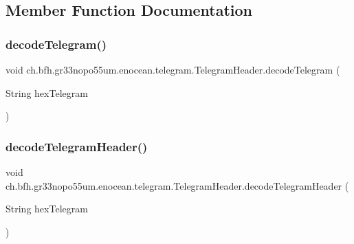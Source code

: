 \subsection{Member Function Documentation}
\hypertarget{classch_1_1bfh_1_1gr33nopo55um_1_1enocean_1_1telegram_1_1_telegram_header_a9f1071f31c3eb9f555480aea587b4ccb}{}\label{classch_1_1bfh_1_1gr33nopo55um_1_1enocean_1_1telegram_1_1_telegram_header_a9f1071f31c3eb9f555480aea587b4ccb} 
\subsubsection{\texorpdfstring{decode\+Telegram()}{decodeTelegram()}}
{\footnotesize\ttfamily void ch.\+bfh.\+gr33nopo55um.\+enocean.\+telegram.\+Telegram\+Header.\+decode\+Telegram (\begin{DoxyParamCaption}\item[{String}]{hex\+Telegram }\end{DoxyParamCaption})}

\hypertarget{classch_1_1bfh_1_1gr33nopo55um_1_1enocean_1_1telegram_1_1_telegram_header_a436b8f22f13d0f91aa9c8e3f164d15d5}{}\label{classch_1_1bfh_1_1gr33nopo55um_1_1enocean_1_1telegram_1_1_telegram_header_a436b8f22f13d0f91aa9c8e3f164d15d5} 
\subsubsection{\texorpdfstring{decode\+Telegram\+Header()}{decodeTelegramHeader()}}
{\footnotesize\ttfamily void ch.\+bfh.\+gr33nopo55um.\+enocean.\+telegram.\+Telegram\+Header.\+decode\+Telegram\+Header (\begin{DoxyParamCaption}\item[{String}]{hex\+Telegram }\end{DoxyParamCaption})}

